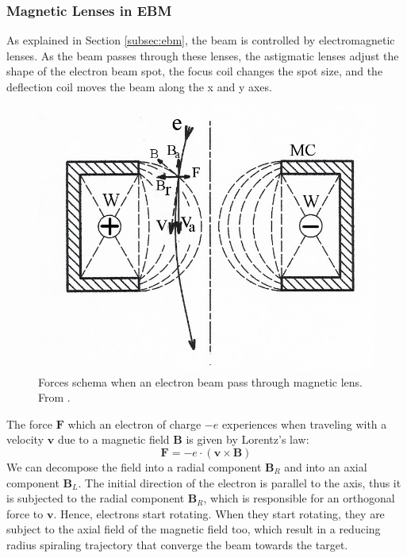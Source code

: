 \subsubsection{Magnetic Lenses in EBM}
\label{sssec:magneticlens}
As explained in Section \ref{subsec:ebm}, the beam is controlled by electromagnetic lenses. As the beam passes through these lenses, the astigmatic lenses adjust the shape of the electron beam spot, the focus coil changes the spot size, and the deflection coil moves the beam along the x and y axes.
\begin{figure}
    \centering
    \includegraphics[scale=0.9]{Images/Magnetic_lens.jpg}
    \caption[Magnetic lens.]{Forces schema when an electron beam pass through magnetic lens. From \cite{various_magnetic_2023}.}
    \label{fig:magneticlens}
\end{figure}
The force $\mathbf{F}$ which an electron of charge $-e$ experiences when traveling with a velocity $\mathbf{v}$ due to a magnetic field $\mathbf{B}$ is given by Lorentz's law:
\begin{equation}
    \mathbf{F} = -e\cdot \left( \mathbf{v} \times \mathbf{B}\right)
\end{equation}
We can decompose the field into a radial component $\mathbf{B}_R$ and into an axial component $\mathbf{B}_L$. The initial direction of the electron is parallel to the axis, thus it is subjected to the radial component $\mathbf{B}_R$, which is responsible for an orthogonal force to $\mathbf{v}$. Hence, electrons start rotating. When they start rotating, they are subject to the axial field of the magnetic field too, which result in a reducing radius spiraling trajectory that converge the beam towards the target.
